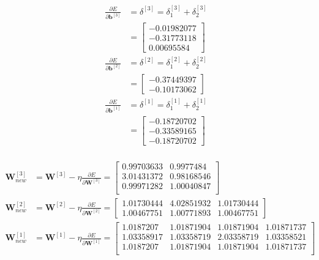 \documentclass[12pt]{article}
\begin{document}
\begin{enumerate}[leftmargin=\labelsep]
    \begin{equation}
    \begin{aligned}
        \frac{\partial E}{\partial \mathbf{b}^{[3]}} &= \delta^{[3]} = \delta_1^{[3]} + \delta_2^{[3]} \\
        &= \begin{bmatrix}
            -0.01982077 \\-0.31773118 \\ 0.00695584
        \end{bmatrix} \\
        \frac{\partial E}{\partial \mathbf{b}^{[2]}} &= \delta^{[2]} = \delta_1^{[2]} + \delta_2^{[2]} \\
        &= \begin{bmatrix}
            -0.37449397 \\ -0.10173062
        \end{bmatrix} \\
        \frac{\partial E}{\partial \mathbf{b}^{[1]}} &= \delta^{[1]} = \delta_1^{[1]} + \delta_2^{[1]} \\
        &= \begin{bmatrix}
            -0.18720702 \\ -0.33589165 \\ -0.18720702
        \end{bmatrix} \\
    \end{aligned}
    \end{equation}

    \begin{equation}
    \begin{aligned}
        \mathbf{W}_{new}^{[3]} &= \mathbf{W}^{[3]} - \eta \frac{\partial E}{\partial \mathbf{W}^{[3]}}
        = \begin{bmatrix}
            0.99703633 & 0.9977484 \\
            3.01431372 & 0.98168546 \\
            0.99971282 & 1.00040847 \\
            \end{bmatrix} \\
        \mathbf{W}_{new}^{[2]} &= \mathbf{W}^{[2]} - \eta \frac{\partial E}{\partial \mathbf{W}^{[2]}}
        = \begin{bmatrix}
            1.01730444 & 4.02851932 & 1.01730444 \\
            1.00467751 & 1.00771893 & 1.00467751
        \end{bmatrix} \\
        \mathbf{W}_{new}^{[1]} &= \mathbf{W}^{[1]} - \eta \frac{\partial E}{\partial \mathbf{W}^{[1]}}
        = \begin{bmatrix}
            1.0187207  & 1.01871904 & 1.01871904 & 1.01871737 \\
            1.03358917 & 1.03358719 & 2.03358719 & 1.03358521 \\
            1.0187207  & 1.01871904 & 1.01871904 & 1.01871737 \\
            \end{bmatrix}
    \end{aligned}
    \end{equation}


\end{enumerate}
\end{document}
